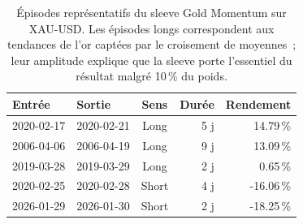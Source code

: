 \begin{table}[H]
\centering
\caption{Épisodes représentatifs du sleeve Gold Momentum sur XAU-USD. Les épisodes longs correspondent aux tendances de l'or captées par le croisement de moyennes~; leur amplitude explique que la sleeve porte l'essentiel du résultat malgré 10\,\% du poids.}
\label{tab:trades_gold_momentum}
\begin{tabular}{llcrr}
\toprule
Entrée & Sortie & Sens & Durée & Rendement \\
\midrule
2020-02-17 & 2020-02-21 & Long & 5 j & 14.79\,\% \\
2006-04-06 & 2006-04-19 & Long & 9 j & 13.09\,\% \\
2019-03-28 & 2019-03-29 & Long & 2 j & 0.65\,\% \\
2020-02-25 & 2020-02-28 & Short & 4 j & -16.06\,\% \\
2026-01-29 & 2026-01-30 & Short & 2 j & -18.25\,\% \\
\bottomrule
\end{tabular}
\end{table}

